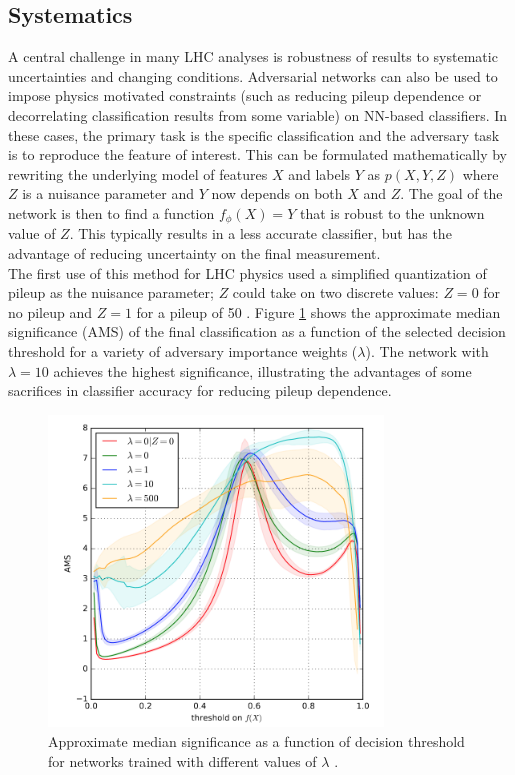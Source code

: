 \subsection{Systematics}
A central challenge in many LHC analyses is robustness of results to systematic uncertainties and changing conditions. Adversarial networks can also be used to impose physics motivated constraints (such as reducing pileup dependence or decorrelating classification results from some variable) on NN-based classifiers. In these cases, the primary task is the specific classification and the adversary task is to reproduce the feature of interest. This can be formulated mathematically by rewriting the underlying model of features $X$ and labels $Y$ as $p(X,Y,Z)$ where $Z$ is a nuisance parameter and $Y$ now depends on both $X$ and $Z$. The goal of the network is then to find a function $f_{\phi}(X)=Y$ that is robust to the unknown value of $Z$. This typically results in a less accurate classifier, but has the advantage of reducing uncertainty on the final measurement.\\

The first use of this method for LHC physics used a simplified quantization of pileup as the nuisance parameter; $Z$ could take on two discrete values: $Z=0$ for no pileup and $Z=1$ for a pileup of 50 \cite{pivot_paper}. Figure \ref{fig:pivot_plot} shows the approximate median significance (AMS) of the final classification as a function of the selected decision threshold for a variety of adversary importance weights ($\lambda$). The network with $\lambda=10$ achieves the highest significance, illustrating the advantages of some sacrifices in classifier accuracy for reducing pileup dependence.\\

\begin{figure}[htb!]
    \centering
    \includegraphics[width=3.5in]{figures/chapter4/pivot_an_plot.png}
    \caption{Approximate median significance as a function of decision threshold for networks trained with different values of $\lambda$ \cite{pivot_paper}.}
    \label{fig:pivot_plot}
\end{figure}

